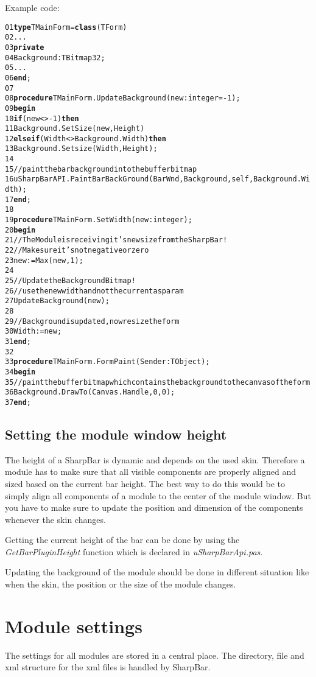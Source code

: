 \documentclass[a4paper]{article}
\begin{document}
    Example code: 
\begin{alltt}
01  {\bf type} TMainForm = {\bf class}(TForm)
02     ...
03    {\bf private}
04      Background : TBitmap32;
05      ...
06    {\bf end};
07
08  {\bf procedure} TMainForm.UpdateBackground(new : integer = -1);
09  {\bf begin}
10    {\bf if} (new <> -1) {\bf then}
11      Background.SetSize(new,Height)
12    {\bf else if} (Width <> Background.Width){\bf then}
13      Background.Setsize(Width,Height);
14
15    // paint the bar background into the buffer bitmap
16    uSharpBarAPI.PaintBarBackGround(BarWnd,Background,self,Background.Width);
17  {\bf end};
18 
19  {\bf procedure} TMainForm.SetWidth(new : integer);
20  {\bf begin}
21    // The Module is receiving it's new size from the SharpBar!
22    // Make sure it's not negative or zero
23    new := Max(new,1);
24 
25    // Update the Background Bitmap!
26    // use the new width and not the current as param
27    UpdateBackground(new);
28 
29    // Background is updated, now resize the form
30    Width := new;
31  {\bf end};
32
33  {\bf procedure} TMainForm.FormPaint(Sender: TObject);
34  {\bf begin}
35    // paint the buffer bitmap which contains the background to the canvas of the form
36    Background.DrawTo(Canvas.Handle,0,0);
37  {\bf end};
\end{alltt}

\newpage
  \subsection{Setting the module window height}
    The height of a SharpBar is dynamic and depends on the used skin. Therefore a module has to make sure that all visible components are properly aligned and sized based on the current bar height. The best way to do this would be to simply align all components of a module to the center of the module window. But you have to make sure to update the position and dimension of the components whenever the skin changes. 

    Getting the current height of the bar can be done by using the {\it GetBarPluginHeight} function which is declared in {\it uSharpBarApi.pas}.

    Updating the background of the module should be done in different situation like when the skin, the position or the size of the module changes.  
    
\section{Module settings}
  The settings for all modules are stored in a central place. The directory, file and xml structure for the xml files is handled by SharpBar.
  
\end{document}
